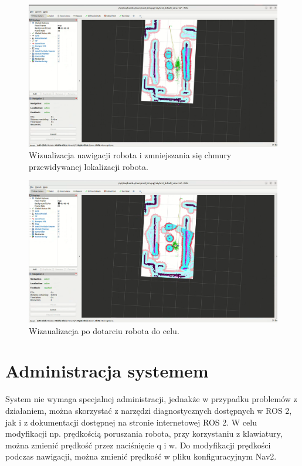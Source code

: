 \documentclass[a4paper,twoside,12pt]{book}
\begin{document}
\begin{figure}[!hb]
	\centering
	\includegraphics[width=1\textwidth]{images/launch-nav5.png}
	\caption{Wizualizacja nawigacji robota i zmniejszania się chmury przewidywanej lokalizacji robota.}
	\label{fig:nav-map5}
\end{figure}
\newpage
\begin{figure}[!hb]
	\centering
	\includegraphics[width=1\textwidth]{images/launch-nav6.png}
	\caption{Wizaualizacja po dotarciu robota do celu.}
	\label{fig:nav-map6}
\end{figure}

\section{Administracja systemem}
System nie wymaga specjalnej administracji, jednakże w przypadku problemów z działaniem, można skorzystać z narzędzi diagnostycznych dostępnych w ROS 2, jak i z dokumentacji dostępnej na stronie internetowej ROS 2. W celu modyfikacji np. prędkością poruszania robota, przy korzystaniu z klawiatury, można zmienić prędkość przez naciśnięcie q i w. Do modyfikacji prędkości podczas nawigacji, można zmienić prędkość w pliku konfiguracyjnym Nav2.
\end{document}
